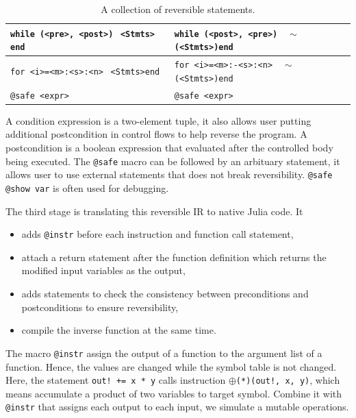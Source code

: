 \documentclass[aps,twocolumn,longbibliography,english,superscriptaddress,prr]{revtex4-1}
\newcommand{\<}{\langle}
\renewcommand{\>}{\rangle}
\theoremstyle{definition}\newtheorem{definition}{\textit{Definition}}
\begin{document}
\begin{table}[h!]
\begin{minipage}{\columnwidth}
{\begin{tabularx}{\textwidth}{X X}
            \hline
            \texttt{while (<pre>, <post>)\newline $_\quad$<Stmts> \newline end} & \texttt{while (<post>, <pre>)\newline $_\quad$ $\sim$(<Stmts>)\newline end}\\
            \hline
            \texttt{for <i>=<m>:<s>:<n>\newline $_\quad$<Stmts>\newline end} & \texttt{for <i>=<m>:-<s>:<n>\newline $_\quad$ $\sim$(<Stmts>)\newline end}\\
            \hline
            \texttt{@safe <expr>} & \texttt{@safe <expr>}\\
            \bottomrule
        \end{tabularx}
    }
    \caption{A collection of reversible statements.}\label{tbl:revstatements}
\end{minipage}
\end{table}

A condition expression is a two-element tuple, it also allows user putting additional postcondition in control flows to help reverse the program.
A postcondition is a boolean expression that evaluated after the controlled body being executed.
The \texttt{@safe} macro can be followed by an arbituary statement, it allows user to use external statements that does not break reversibility.
\texttt{@safe @show var} is often used for debugging.

The third stage is translating this reversible IR to native Julia code.
It
\begin{itemize}
    \item adds \texttt{@instr} before each instruction and function call statement,
    \item attach a return statement after the function definition which returns the modified input variables as the output,
    \item adds statements to check the consistency between preconditions and postconditions to ensure reversibility,
    \item compile the inverse function at the same time.
\end{itemize}
The macro \texttt{@instr} assign the output of a function to the argument list of a function. Hence, the values are changed while the symbol table is not changed. Here, the statement \texttt{out! += x * y} calls instruction \texttt{$\oplus$(*)(out!, x, y)}, which means accumulate a product of two variables to target symbol. Combine it with \texttt{@instr} that assigns each output to each input, we simulate a mutable operations.
\end{document}
